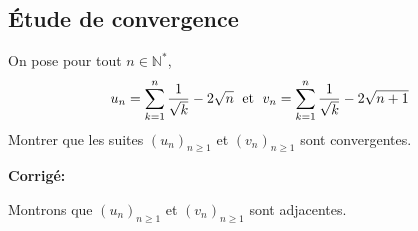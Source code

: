 \documentclass[a4paper,twoside,french,10pt]{VcCours}
\newcommand{\corr}{\textbf{Corrigé:}}
\begin{document}

\tableofcontents
\separationTitre


\subsection{Étude de convergence}


\begin{Exercice}{}
On pose pour tout $n \in \mathbb{N}^*$, 
    \[
    u_n = \sum_{k = 1}^n {\frac{1}{\sqrt k}} - 2\sqrt n \; \hbox{ et } \; v_n = \sum_{k = 1}^n {\frac{1}{\sqrt k}} - 2\sqrt {n + 1}
    \]
 Montrer que les suites $(u_n)_{n \geq 1}$ et $(v_n)_{n \geq 1}$ sont convergentes.
 \end{Exercice}
 
 \corr

Montrons que $(u_n)_{n \geq 1}$ et $(v_n)_{n \geq 1}$ sont adjacentes.
\end{document}
